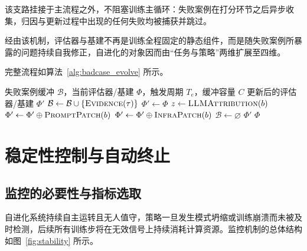 该支路挂接于主流程之外，不阻塞训练主循环：失败案例在打分环节之后异步收集，归因与更新过程中出现的任何失败均被捕获并跳过。

经由该机制，评估器与基建不再是训练全程固定的静态组件，而是随失败案例所暴露的问题持续自我修正，自进化的对象因而由“任务与策略”两维扩展至四维。

完整流程如算法~\ref{alg:badcase_evolve} 所示。

\begin{algorithm}[htbp]
\caption{失败案例驱动的评估器与基建自演化}
\label{alg:badcase_evolve}
\begin{algorithmic}[1]
\Require 失败案例缓冲 $\mathcal{B}$，当前评估器/基建 $\Phi$，触发周期 $T_e$，缓冲容量 $C$
\Ensure 更新后的评估器/基建 $\Phi'$
     
        \State $\mathcal{B} \gets \mathcal{B} \cup \{\textproc{Evidence}(\tau)\}$ 
    \EndIf
\EndFor
{} 
    \State $\Phi' \gets \Phi$
        \State $z \gets \textproc{LLMAttribution}(b)$ 
            \State $\Phi' \gets \Phi' \oplus \textproc{PromptPatch}(b)$ 
            \State $\Phi' \gets \Phi' \oplus \textproc{InfraPatch}(b)$ 
        \EndIf
    \EndFor
    \State $\mathcal{B} \gets \varnothing$ 
    \State \Return $\Phi'$
\EndIf
\State \Return $\Phi$ 
\end{algorithmic}
\end{algorithm}

\section{稳定性控制与自动终止}
\label{sec:stability}

\subsection{监控的必要性与指标选取}

自进化系统持续自主运转且无人值守，策略一旦发生模式坍缩或训练崩溃而未被及时检测，后续所有训练步将在无效信号上持续消耗计算资源。监控机制的总体结构如图~\ref{fig:stability} 所示。

